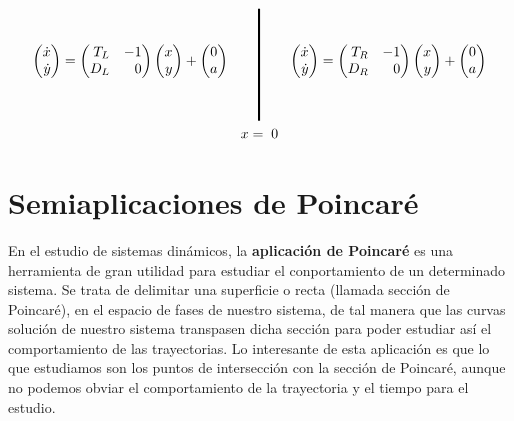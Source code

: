 \documentclass[12pt,a4paper]{report} %
\begin{document}
	\begin{equation}
		\label{eq:lienardrlgr}
		\begin{gathered}
			\begin{pmatrix*}[r]
				\dot{x}\\ \dot{y}
			\end{pmatrix*}= \begin{pmatrix*}[r]
				T_L & -1 \\ D_L & 0
			\end{pmatrix*} \begin{pmatrix*}[r]
				x \\ y
			\end{pmatrix*}+\begin{pmatrix*}[c]
				0 \\ a
			\end{pmatrix*} \qquad 
			\rule[-40pt]{1.5pt}{80pt} \qquad 
			\begin{pmatrix*}[r]
				\dot{x}\\ \dot{y}
			\end{pmatrix*}= \begin{pmatrix*}[r]
				T_R & -1 \\ D_R & 0
			\end{pmatrix*} \begin{pmatrix*}[r]
				x \\ y
			\end{pmatrix*}+\begin{pmatrix*}[c]
				0 \\ a
			\end{pmatrix*} \\ x=\;0
		\end{gathered}
	\end{equation}\smallskip
	
	\newpage
	
	\chapter{Semiaplicaciones de Poincaré}
	\label{sec:4}
	En el estudio de sistemas dinámicos, la \textbf{aplicación de Poincaré} es una herramienta de gran utilidad para estudiar el conportamiento de un determinado sistema. Se trata de delimitar una superficie o recta (llamada sección de Poincaré), en el espacio de fases de nuestro sistema, de tal manera que las curvas solución de nuestro sistema transpasen dicha sección para poder estudiar así el comportamiento de las trayectorias. Lo interesante de esta aplicación es que lo que estudiamos son los puntos de intersección con la sección de Poincaré, aunque no podemos obviar el comportamiento de la trayectoria y el tiempo para el estudio.\\[0.5cm]
	
\end{document}
